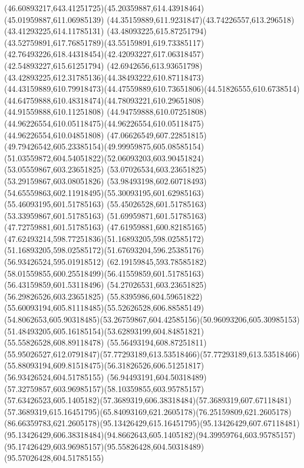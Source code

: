 {{		\curveto(46.60893217,643.41251725)(45.20359887,614.43918464)(45.01959887,611.06985139)
		\curveto(44.35159889,611.9231847)(43.74226557,613.296518)(43.41293225,614.11785131)
		\curveto(43.48093225,615.87251794)(43.52759891,617.76851789)(43.55159891,619.73385117)
		\curveto(42.76493226,618.44318454)(42.42093227,617.06318457)(42.54893227,615.61251794)
		\curveto(42.6942656,613.93651798)(43.42893225,612.31785136)(44.38493222,610.87118473)
		\curveto(44.43159889,610.79918473)(44.47559889,610.73651806)(44.51826555,610.6738514)
		\curveto(44.64759888,610.48318474)(44.78093221,610.29651808)(44.91559888,610.11251808)
		\curveto(44.94759888,610.07251808)(44.96226554,610.05118475)(44.96226554,610.05118475)
		\lineto(44.96226554,610.04851808)
		\curveto(47.06626549,607.22851815)(49.79426542,605.23385154)(49.99959875,605.08585154)
		\curveto(51.03559872,604.54051822)(52.06093203,603.90451824)(53.05559867,603.23651825)
		\lineto(53.07026534,603.23651825)
		\lineto(53.29159867,603.08051826)
		\curveto(53.98493198,602.60718493)(54.65559863,602.11918495)(55.30093195,601.62985163)
		\lineto(55.46093195,601.51785163)
		\lineto(55.45026528,601.51785163)
		\lineto(53.33959867,601.51785163)
		\lineto(51.69959871,601.51785163)
		\lineto(47.72759881,601.51785163)
		\curveto(47.61959881,600.82185165)(47.62493214,598.77251836)(51.16893205,598.02585172)
		\curveto(51.16893205,598.02585172)(51.67693204,596.25385176)(56.93426524,595.01918512)
		\curveto(62.19159845,593.78585182)(58.01559855,600.25518499)(56.41559859,601.51785163)
		\lineto(56.43159859,601.53118496)
		\lineto(54.27026531,603.23651825)
		\lineto(56.29826526,603.23651825)
		\curveto(55.8395986,604.59651822)(55.60093194,605.81118485)(55.52626528,606.88585149)
		\curveto(54.8062653,605.90318485)(53.26759867,604.42585156)(50.96093206,605.30985153)
		\curveto(51.48493205,605.16185154)(53.62893199,604.84851821)(55.55826528,608.89118478)
		\lineto(55.56493194,608.87251811)
		\curveto(55.95026527,612.0791847)(57.77293189,613.53518466)(57.77293189,613.53518466)
		\curveto(55.88093194,609.81518475)(56.31826526,606.51251817)(56.93426524,604.51785155)
		\curveto(56.94493191,604.50318489)(57.32759857,603.96985157)(58.10359855,603.95785157)
		\curveto(57.63426523,605.1405182)(57.3689319,606.38318484)(57.3689319,607.67118481)
		\curveto(57.3689319,615.16451795)(65.84093169,621.2605178)(76.25159809,621.2605178)
		\curveto(86.66359783,621.2605178)(95.13426429,615.16451795)(95.13426429,607.67118481)
		\curveto(95.13426429,606.38318484)(94.8662643,605.1405182)(94.39959764,603.95785157)
		\curveto(95.17426429,603.96985157)(95.55826428,604.50318489)(95.57026428,604.51785155)
}}
